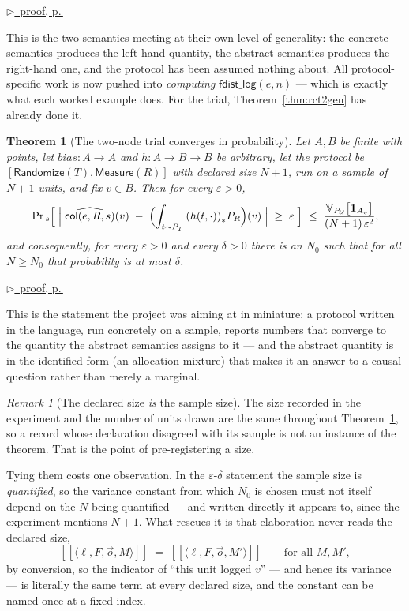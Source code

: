 \documentclass[11pt,a4paper]{article}
\theoremstyle{definition}
\theoremstyle{plain}
\newtheorem{theorem}[definition]{Theorem}
\theoremstyle{remark}
\newtheorem{remark}[definition]{Remark}
\newcommand{\Ctx}{\mathcal{U}}         %
\newcommand{\push}[1]{{#1}_{*}}        %
\newcommand{\emp}[1]{\widehat{#1}}
\newcommand{\Ind}[1]{\mathbf{1}_{#1}}
\newcommand{\Var}{\mathbb{V}}
\renewcommand{\Pr}{\mathrm{Pr}}
\providecommand{\llbracket}{[\![}
\providecommand{\rrbracket}{]\!]}
\newcommand{\pfref}[1]{%
  \par\smallskip\noindent
  \hyperref[pf:#1]{\small$\triangleright$\ proof, p.\,\pageref{pf:#1}}\par\smallskip}
\begin{document}
\pfref{thm:llnany}

This is the two semantics meeting at their own level of generality: the
concrete semantics produces the left-hand quantity, the abstract semantics
produces the right-hand one, and the protocol has been assumed nothing
about. All protocol-specific work is now pushed into \emph{computing}
$\mathsf{fdist\_log}(e,n)$ --- which is exactly what each worked example
does. For the trial, Theorem~\ref{thm:rct2gen} has already done it.

\begin{theorem}[The two-node trial converges in probability]
\label{thm:rct2emp}
Let $A, B$ be finite with points, let $\mathit{bias} : A \to A$ and
$h : A \to B \to B$ be arbitrary, let the protocol be
$[\mathsf{Randomize}(T), \mathsf{Measure}(R)]$ with declared size $N+1$,
run on a sample of $N+1$ units, and fix $v \in B$. Then for every
$\varepsilon > 0$,
\[
  \Pr_{\,s}
  \Bigl[\;
     \Bigl|\;\emp{\mathsf{col}(e,R,s)}(v)
       \;-\; \Bigl(\int_{t \sim P_T} \push{(h(t,\cdot))}P_R\Bigr)(v)
     \;\Bigr| \;\ge\; \varepsilon
  \;\Bigr]
  \;\le\;
  \frac{\Var_{P_\Ctx}\bigl[\Ind{A_v}\bigr]}{(N+1)\,\varepsilon^{2}} ,
\]
and consequently, for every $\varepsilon > 0$ and every $\delta > 0$ there
is an $N_0$ such that for all $N \ge N_0$ that probability is at most
$\delta$.
\end{theorem}

\pfref{thm:rct2emp}

This is the statement the project was aiming at in miniature: a protocol
written in the language, run concretely on a sample, reports numbers that
converge to the quantity the abstract semantics assigns to it --- and the
abstract quantity is in the identified form (an allocation mixture) that
makes it an answer to a causal question rather than merely a marginal.

\begin{remark}[The declared size \emph{is} the sample size]
\label{rem:twosizes}
The size recorded in the experiment and the number of units drawn are the
same throughout Theorem~\ref{thm:rct2emp}, so a record whose declaration
disagreed with its sample is not an instance of the theorem. That is the
point of pre-registering a size.

Tying them costs one observation. In the $\varepsilon$-$\delta$ statement
the sample size is \emph{quantified}, so the variance constant from which
$N_0$ is chosen must not itself depend on the $N$ being quantified --- and
written directly it appears to, since the experiment mentions $N+1$. What
rescues it is that elaboration never reads the declared size,
\[
  \llbracket \langle \ell, F, \vec{o}, M \rangle \rrbracket
  \;=\;
  \llbracket \langle \ell, F, \vec{o}, M' \rangle \rrbracket
  \qquad\text{for all } M, M',
\]
by conversion, so the indicator of ``this unit logged $v$'' --- and hence
its variance --- is literally the same term at every declared size, and
the constant can be named once at a fixed index.
\end{remark}
\end{document}
